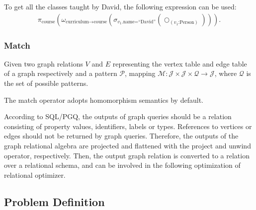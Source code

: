 \begin{example}
    To get all the classes taught by David, the following expression can be used:
    \begin{equation*}
        \begin{split}
            \pi_{\text{course}}(\omega_{\text{curriculum} \rightarrow \text{course}}(\sigma_{v_1\text{.name=``David''}}(\bigcirc_{(v_1\text{:Person})}))).
        \end{split}
    \end{equation*}
\end{example}

\subsubsection{Match}

Given two graph relations $V$ and $E$ representing the vertex table and edge table of a graph respectively and a pattern $\mathcal{P}$, mapping $\mathcal{M}: \mathcal{J} \times \mathcal{J} \times \mathcal{Q} \rightarrow \mathcal{J}$, where $\mathcal{Q}$ is the set of possible patterns.

The match operator adopts homomorphism semantics by default.

According to SQL/PGQ, the outputs of graph queries should be a relation consisting of property values, identifiers, labels or types.
References to vertices or edges should not be returned by graph queries.
Therefore, the outputs of the graph relational algebra are projected and flattened with the project and unwind operator, respectively.
Then, the output graph relation is converted to a relation over a relational schema, and can be involved in the following optimization of relational optimizer.
\fi

\subsection{Problem Definition}
\label{sec:problem-definition}

